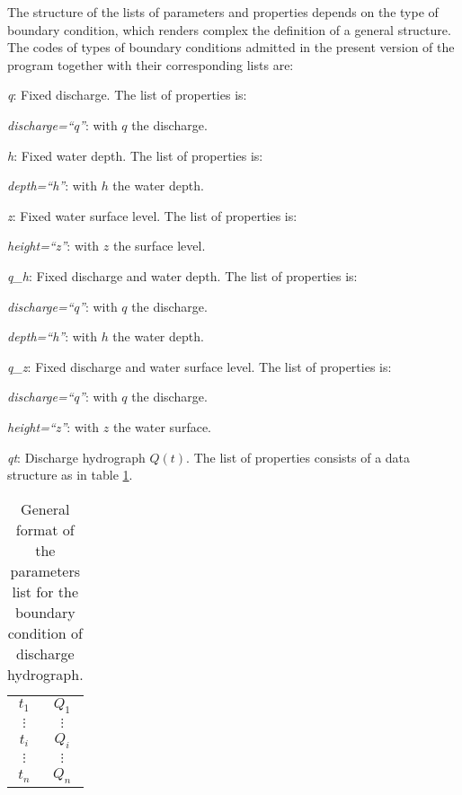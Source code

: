 \documentclass[a4paper,12pt]{article}
\newcommand{\TABLE}[4]
{
	\begin{table}[ht!]\centering
	\begin{tabular}{#1}\hline#2\\\hline\end{tabular}
	\caption{#3.\label{#4}}\end{table}
}
\begin{document}
The structure of the lists of parameters and properties depends on the type of boundary condition, which renders complex the definition of a general structure. The codes of types of boundary conditions admitted in the present version of the program together with their corresponding lists are: 
\begin{description}
\item\emph{q}: Fixed discharge. The list of properties is:
\begin{description}
\item\emph{discharge=``q''}: with $q$ the discharge.
\end{description}
\item\emph{h}: Fixed water depth. The list of properties is:
\begin{description}
\item\emph{depth=``h''}: with $h$ the water depth.
\end{description}
\item\emph{z}: Fixed water surface level. The list of properties is:
\begin{description}
\item\emph{height=``z''}: with $z$ the surface level.
\end{description}
\item\emph{q\_h}: Fixed discharge and water depth. The list of properties is:
\begin{description}
\item\emph{discharge=``q''}: with $q$ the discharge.
\item\emph{depth=``h''}: with $h$ the water depth.
\end{description}
\item\emph{q\_z}: Fixed discharge and water surface level. The list of properties is:
\begin{description}
\item\emph{discharge=``q''}: with $q$ the discharge.
\item\emph{height=``z''}: with $z$ the water surface.
\end{description}
\item\emph{qt}: Discharge hydrograph $Q(t)$. The list of properties consists of a data structure as in table \ref{TabCCQT}.
\TABLE{cc}
{
	$t_1$&$Q_1$\\$\vdots$&$\vdots$\\
	$t_i$&$Q_i$\\$\vdots$&$\vdots$\\
	$t_n$&$Q_n$
}{General format of the parameters list for the boundary condition of discharge hydrograph}{TabCCQT}


\end{description}
\end{document}
